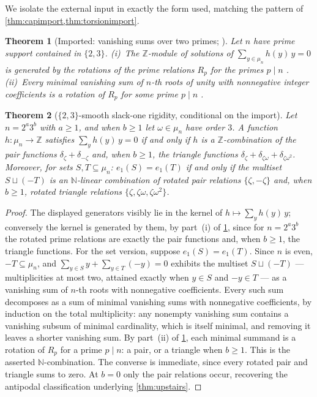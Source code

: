 \documentclass[11pt]{article}
\newtheorem{theorem}{Theorem}[section]
\theoremstyle{definition}
\newcommand{\Z}{\mathbb Z}
\newcommand{\N}{\mathbb N}
\newcommand{\mufn}{\mu_n}
\begin{document}
We isolate the external input in exactly the form used, matching the pattern of \cref{thm:capimport,thm:torsionimport}.

\begin{theorem}[Imported: vanishing sums over two primes; \cite{Sch64,CJ76,LL00}]\label{thm:vsimport}
Let $n$ have prime support contained in $\{2,3\}$.  (i)~The $\Z$-module of solutions of $\sum_{y\in\mufn}h(y)\,y=0$ is generated by the rotations of the prime relations $R_p$ for the primes $p\mid n$ \cite{Sch64}.  (ii)~Every minimal vanishing sum of $n$-th roots of unity with nonnegative integer coefficients is a rotation of $R_p$ for some prime $p\mid n$ \cite{CJ76,LL00}.
\end{theorem}

\begin{theorem}[$\{2,3\}$-smooth slack-one rigidity, conditional on the import]\label{thm:23rigidity}
Let $n=2^a3^b$ with $a\ge1$, and when $b\ge1$ let $\omega\in\mufn$ have order $3$.  A function $h:\mufn\to\Z$ satisfies $\sum_yh(y)\,y=0$ if and only if $h$ is a $\Z$-combination of the pair functions $\delta_\zeta+\delta_{-\zeta}$ and, when $b\ge1$, the triangle functions $\delta_\zeta+\delta_{\zeta\omega}+\delta_{\zeta\omega^2}$.  Moreover, for sets $S,T\subseteq\mufn$: $e_1(S)=e_1(T)$ if and only if the multiset $S\sqcup(-T)$ is an $\N$-linear combination of rotated pair relations $\{\zeta,-\zeta\}$ and, when $b\ge1$, rotated triangle relations $\{\zeta,\zeta\omega,\zeta\omega^2\}$.
\end{theorem}

\begin{proof}
The displayed generators visibly lie in the kernel of $h\mapsto\sum_yh(y)\,y$; conversely the kernel is generated by them, by part~(i) of \cref{thm:vsimport}, since for $n=2^a3^b$ the rotated prime relations are exactly the pair functions and, when $b\ge1$, the triangle functions.  For the set version, suppose $e_1(S)=e_1(T)$.  Since $n$ is even, $-T\subseteq\mufn$, and $\sum_{y\in S}y+\sum_{y\in T}(-y)=0$ exhibits the multiset $S\sqcup(-T)$ --- multiplicities at most two, attained exactly when $y\in S$ and $-y\in T$ --- as a vanishing sum of $n$-th roots with nonnegative coefficients.  Every such sum decomposes as a sum of minimal vanishing sums with nonnegative coefficients, by induction on the total multiplicity: any nonempty vanishing sum contains a vanishing subsum of minimal cardinality, which is itself minimal, and removing it leaves a shorter vanishing sum.  By part~(ii) of \cref{thm:vsimport}, each minimal summand is a rotation of $R_p$ for a prime $p\mid n$: a pair, or a triangle when $b\ge1$.  This is the asserted $\N$-combination.  The converse is immediate, since every rotated pair and triangle sums to zero.  At $b=0$ only the pair relations occur, recovering the antipodal classification underlying \cref{thm:upstairs}.
\end{proof}
\end{document}
